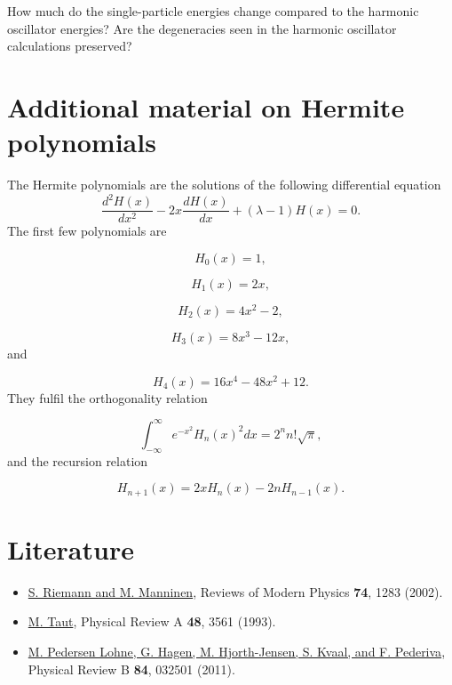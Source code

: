 \documentclass[%
oneside,                 %
final,                   %
10pt]{article}
\begin{document}
How much do the single-particle energies change compared to the harmonic oscillator energies? Are the degeneracies seen in the harmonic oscillator calculations preserved?

\section{Additional material on Hermite polynomials}

The Hermite polynomials are the solutions of the following differential
equation
\begin{equation}
   \frac{d^2H(x)}{dx^2}-2x\frac{dH(x)}{dx}+
       (\lambda-1)H(x)=0.
   \label{eq:hermite}
\end{equation}
The first few polynomials are

\begin{equation*}
   H_0(x)=1,
\end{equation*}

\begin{equation*}
    H_1(x)=2x,
\end{equation*}

\begin{equation*}
    H_2(x)=4x^2-2,
\end{equation*}

\begin{equation*}
    H_3(x)=8x^3-12x,
\end{equation*}
and

\begin{equation*}
    H_4(x)=16x^4-48x^2+12.
\end{equation*}
They fulfil the orthogonality relation

\begin{equation*}
  \int_{-\infty}^{\infty}e^{-x^2}H_n(x)^2dx=2^nn!\sqrt{\pi},
\end{equation*}
and the recursion relation

\begin{equation*}
  H_{n+1}(x)=2xH_{n}(x)-2nH_{n-1}(x).
\end{equation*}




\section{Literature}
\begin{itemize}
  \item \href{{https://journals.aps.org/rmp/issues/74/4}}{S. Riemann and M. Manninen}, Reviews of Modern Physics \textbf{74}, 1283 (2002). 

  \item \href{{http://journals.aps.org/pra/abstract/10.1103/PhysRevA.48.3561}}{M. Taut}, Physical Review A \textbf{48}, 3561 (1993).

  \item \href{{https://journals.aps.org/prb/abstract/10.1103/PhysRevB.84.115302}}{M. Pedersen Lohne, G. Hagen, M. Hjorth-Jensen, S. Kvaal, and F. Pederiva}, Physical Review B \textbf{84}, 032501 (2011).
\end{itemize}
\end{document}
